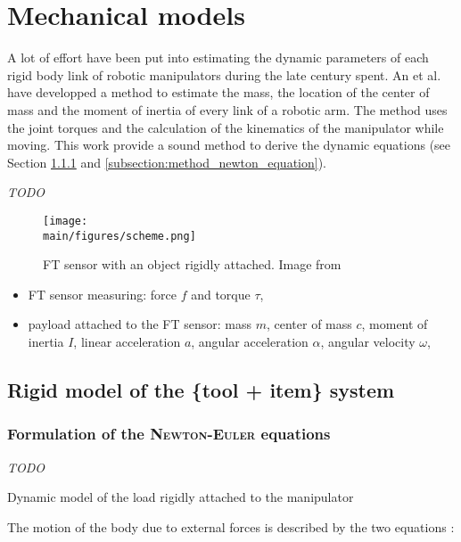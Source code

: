 \documentclass[/home/francois/latex/report/main.tex]{subfiles}
\begin{document}
\section{Mechanical models}
\label{section:description}

A lot of effort have been put into estimating the dynamic parameters of each rigid body link of robotic manipulators during the late century spent. An et al. \cite{An1985} have developped a method to estimate the mass, the location of the center of mass and the moment of inertia of every link of a robotic arm. The method uses the joint torques and the calculation of the kinematics of the manipulator while moving. This work provide a sound method to derive the dynamic equations (see Section \ref{subsubsection:background_newton_equation} and \ref{subsection:method_newton_equation}).

\textit{TODO}

\begin{figure}[H]
  \centering
  \texttt{[image: \\main/figures/scheme.png]}
  \caption{\ac{FT} sensor with an object rigidly attached. Image from \cite{Kubus2007}}
\end{figure}

\begin{itemize}
 \item \ac{FT} sensor measuring: force $f$ and torque $\tau$,
 \item payload attached to the \ac{FT} sensor: mass $m$, center of mass $c$, moment of inertia $I$, linear acceleration $a$, angular acceleration $\alpha$, angular velocity $\omega$,
\end{itemize}

\subsection{Rigid model of the \{tool + item\} system}

\subsubsection{Formulation of the \textsc{Newton-Euler} equations}
\label{subsubsection:background_newton_equation}

\textit{TODO}

Dynamic model of the load rigidly attached to the manipulator

The motion of the body due to external forces is described by the two equations \cite{Kubus2007, Kubus2008}:
\end{document}
